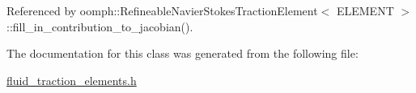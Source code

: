 Referenced by oomph\+::\+Refineable\+Navier\+Stokes\+Traction\+Element$<$ E\+L\+E\+M\+E\+N\+T $>$\+::fill\+\_\+in\+\_\+contribution\+\_\+to\+\_\+jacobian().



The documentation for this class was generated from the following file\+:\begin{DoxyCompactItemize}
\item 
\hyperlink{fluid__traction__elements_8h}{fluid\+\_\+traction\+\_\+elements.\+h}\end{DoxyCompactItemize}
